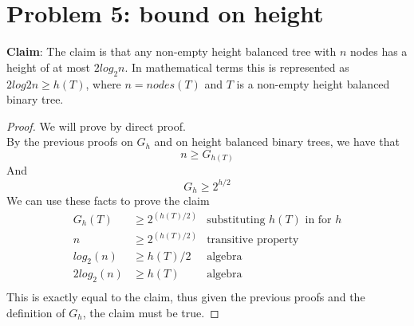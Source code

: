 \documentclass[titlepage]{article}
\begin{document}
\section{Problem 5: bound on height}

\textbf{Claim}: The claim is that any non-empty height balanced tree with $n$ nodes has a height of at most $2log_2n$. In mathematical terms this is represented as $2log2n \geq h(T)$, where $n = nodes(T)$ and $T$ is a non-empty height balanced binary tree.

\begin{proof}
We will prove by direct proof.\\

By the previous proofs on $G_h$ and on height balanced binary trees, we have that
$$n \geq G_{h(T)}$$
And
$$G_h \geq 2^{h/2}$$
We can use these facts to prove the claim
\begin{align*}
G_h(T) &\geq 2^{(h(T)/2)}  & \text{substituting $h(T)$ in for $h$} \\
n &\geq 2^{(h(T)/2)} & \text{transitive property} \\
log_2(n) &\geq h(T)/2 & \text{algebra} \\
2log_2(n) &\geq h(T) & \text{algebra} \\
\end{align*}
This is exactly equal to the claim, thus given the previous proofs and the definition of $G_h$, the claim must be true.

\end{proof}
\end{document}
